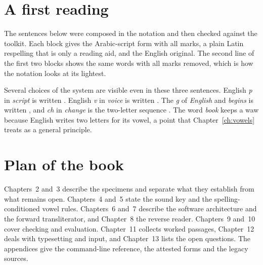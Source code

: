\section{A first reading}
The sentences below were composed in the notation and then checked against the toolkit. Each block gives the Arabic-script form with all marks, a plain Latin respelling that is only a reading aid, and the English original. The second line of the first two blocks shows the same words with all marks removed, which is how the notation looks at its lightest.



Several choices of the system are visible even in these three sentences. English \emph{p} in \emph{script} is written . English \emph{v} in \emph{voice} is written . The \emph{g} of \emph{English} and \emph{begins} is written , and \emph{ch} in \emph{change} is the two-letter sequence . The word \emph{book} keeps a waw because English writes two letters for its vowel, a point that Chapter~\ref{ch:vowels} treats as a general principle.

\section{Plan of the book}
Chapters~2 and~3 describe the specimens and separate what they establish from what remains open. Chapters~4 and~5 state the sound key and the spelling-conditioned vowel rules. Chapters~6 and~7 describe the software architecture and the forward transliterator, and Chapter~8 the reverse reader. Chapters~9 and~10 cover checking and evaluation. Chapter~11 collects worked passages, Chapter~12 deals with typesetting and input, and Chapter~13 lists the open questions. The appendices give the command-line reference, the attested forms and the legacy sources.
